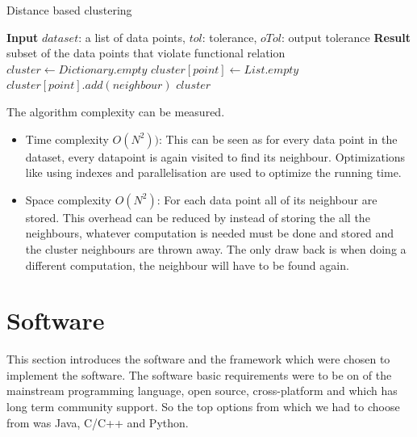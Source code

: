 \begin{algorithm}
	\caption{Distance based clustering}\label{dbscanExistence}
	\begin{algorithmic}[1]
		\State \textbf{Input} $dataset$: a list of data points, $tol$: tolerance, $oTol$: output tolerance
		\State \textbf{Result} subset of the data points that violate functional relation
		\State $cluster \gets Dictionary.empty$
		 
		\State $cluster[point] \gets List.empty$ 	
         
        \State $cluster[point].add(neighbour)$
        \EndIf
        \EndFor
        \EndFor
        \State\Return $cluster$
		\EndProcedure
	\end{algorithmic}
\end{algorithm}


The algorithm complexity can be measured. 
\begin{itemize}
	\item Time complexity \(O(N^2))\): This can be seen as for every data point in the dataset, every datapoint is again visited to find its neighbour. Optimizations like using indexes and parallelisation are used to optimize the running time.
	\item Space complexity \(O(N^2)\): For each data point all of its neighbour are stored. This overhead can be reduced by instead of storing the all the neighbours, whatever computation is needed must be done and stored and the cluster neighbours are thrown away. The only draw back is when doing a different computation, the neighbour will have to be found again. 
\end{itemize}

\section{Software}

This section introduces the software and the framework which were chosen to implement the software. The software basic requirements were to be on of the mainstream programming language, open source, cross-platform and which has long term community support. So the top options from which we had to choose from was Java, C/C++ and Python.

